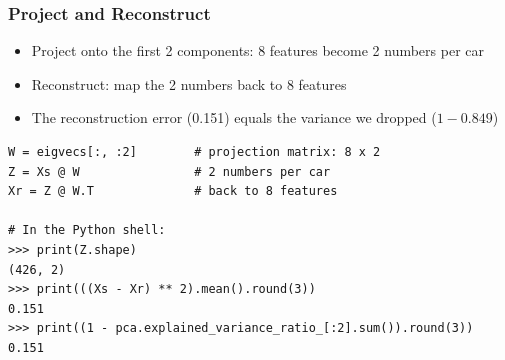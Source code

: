 

\begin{frame}[fragile]\frametitle{Project and Reconstruct}
\begin{itemize}
\item Project onto the first 2 components: 8 features become 2 numbers per car
\item Reconstruct: map the 2 numbers back to 8 features
\item The reconstruction error (0.151) equals the variance we dropped ($1 - 0.849$)
\end{itemize}
\begin{lstlisting}
W = eigvecs[:, :2]        # projection matrix: 8 x 2
Z = Xs @ W                # 2 numbers per car
Xr = Z @ W.T              # back to 8 features

# In the Python shell:
>>> print(Z.shape)
(426, 2)
>>> print(((Xs - Xr) ** 2).mean().round(3))
0.151
>>> print((1 - pca.explained_variance_ratio_[:2].sum()).round(3))
0.151
\end{lstlisting}
\end{frame}

